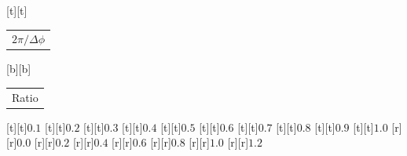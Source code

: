 %    
%
%
\begin{psfrags}%
\psfragscanon%
%
[t][t]{\color[rgb]{0,0,0}\setlength{\tabcolsep}{0pt}\begin{tabular}{c}{\Large$2\pi/\Delta\phi$}\end{tabular}}%
[b][b]{\color[rgb]{0,0,0}\setlength{\tabcolsep}{0pt}\begin{tabular}{c}{\Large{}Ratio}\end{tabular}}%
%
[t][t]{$0.1$}%
[t][t]{$0.2$}%
[t][t]{$0.3$}%
[t][t]{$0.4$}%
[t][t]{$0.5$}%
[t][t]{$0.6$}%
[t][t]{$0.7$}%
[t][t]{$0.8$}%
[t][t]{$0.9$}%
[t][t]{$1.0$}%
%
[r][r]{$0.0$}%
[r][r]{$0.2$}%
[r][r]{$0.4$}%
[r][r]{$0.6$}%
[r][r]{$0.8$}%
[r][r]{$1.0$}%
[r][r]{$1.2$}%
%
%
\end{psfrags}%
%
